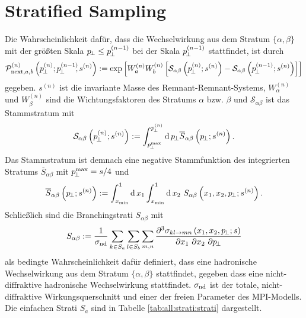 \section{Stratified Sampling}
\label{sec:all:alg:stra}
Die Wahrscheinlichkeit dafür, dass die Wechselwirkung aus dem Stratum $\{\alpha,\beta\}$ mit der größten Skala $p_{\!\perp}\leq p_{\!\perp}^{(n-1)}$ bei der Skala $p_{\!\perp}^{(n-1)}$ stattfindet, ist durch 
\begin{equation}
\mathcal{P}_{\text{next},a,b}^{(n)}\left(p_{\!\perp}^{(n)};p_{\!\perp}^{(n-1)}\!\!,s^{(n)}\right):=\exp\left[W_a^{(n)}W_b^{(n)}
\left[
\mathcal{S}_{\alpha\beta}\left(p_{\!\perp}^{(n)};s^{(n)}\right)
-
\mathcal{S}_{\alpha\beta}\left(p_{\!\perp}^{(n-1)};s^{(n)}\right)
\right]
\right]\label{eq:imp:pnextab}
\end{equation}
gegeben. $s^{(n)}$ ist die invariante Masse des Remnant-Remnant-Systems, $W_\alpha^{(n)}$ und $W_\beta^{(n)}$ sind die Wichtungsfaktoren des Stratums $\alpha$ bzw. $\beta$ und $\mathcal{S}_{\alpha\beta}$ ist das Stammstratum mit
\begin{equation}
  \mathcal{S}_{\alpha\beta}\left(p_{\!\perp}^{(n)};s^{(n)}\right):=\int_{p_{\!\perp}^{\max}}^{p_{\!\perp}^{(n)}}\operatorname{d}p_{\!\perp}\overline{S}_{\alpha\beta}\left(p_{\!\perp};s^{(n)}\right)\label{eq:all:strati_root_def}.
\end{equation}
Das Stammstratum ist demnach eine negative Stammfunktion des integrierten Stratums $\overline{S}_{\alpha\beta}$ mit ${p_{\!\perp}^{\max}}=s/4$ und
\begin{equation}
  \overline{S}_{\alpha\beta}\left(\pperp;s^{(n)}\right):=\int_{x_{\min}}^{1}\der x_1\int_{x_{\min}}^{1}\der x_2\ S_{\alpha\beta}\left(x_1,x_2,\pperp;s^{(n)}\right)\label{eq:imp:double_strati_int}.
\end{equation}
Schließlich sind die Branchingstrati $S_{\alpha\beta}$ mit
\begin{equation}
  S_{\alpha\beta}:=\frac{1}{\sigma_{\operatorname{nd}}}\sum_{k\in S_a}\sum_{l\in S_b}\sum_{m,n}\frac{\partial^3\sigma_{kl\to mn}\left(x_1,x_2,p_{\!\perp};s\right)}{\partial x_1\ \partial x_2\ \partial p_{\!\perp}}
\end{equation}
als bedingte Wahrscheinlichkeit dafür definiert, dass eine hadronische Wechselwirkung aus dem Stratum $\{\alpha,\beta\}$ stattfindet, gegeben dass eine nicht-diffraktive hadronische Wechselwirkung stattfindet. $\sigma_{\operatorname{nd}}$ ist der totale, nicht-diffraktive Wirkungsquerschnitt und einer der freien Parameter des MPI-Modells. Die einfachen Strati $S_a$ sind in Tabelle \ref{tab:all:strati:strati} dargestellt.

